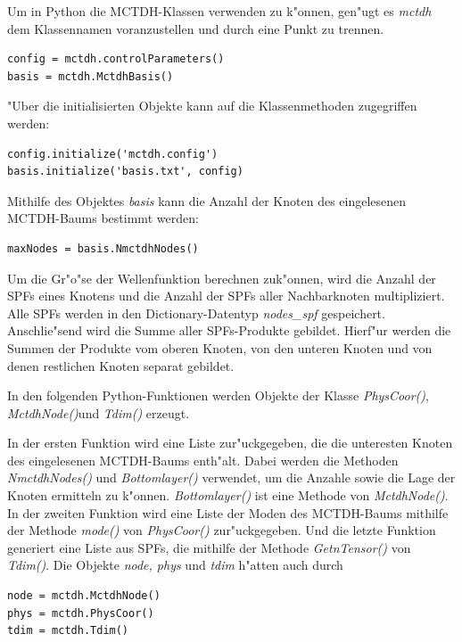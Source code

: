 Um in Python die MCTDH-Klassen verwenden zu k"onnen, gen"ugt es \textit{mctdh} dem Klassennamen voranzustellen und durch eine Punkt zu trennen.

\begin{verbatim}
config = mctdh.controlParameters()
basis = mctdh.MctdhBasis()
\end{verbatim}

"Uber die initialisierten Objekte kann auf die Klassenmethoden zugegriffen werden: 
\begin{verbatim}
config.initialize('mctdh.config')
basis.initialize('basis.txt', config)
\end{verbatim}

Mithilfe des Objektes \textit{basis} kann die Anzahl der Knoten des eingelesenen MCTDH-Baums bestimmt werden:
\begin{verbatim}
maxNodes = basis.NmctdhNodes()
\end{verbatim}

Um die Gr"o"se der Wellenfunktion berechnen zuk"onnen, wird die Anzahl der SPFs eines Knotens
und die Anzahl der SPFs aller Nachbarknoten multipliziert.
Alle SPFs werden in den Dictionary-Datentyp \textit{nodes_spf} gespeichert. 
Anschlie"send wird die Summe aller SPFs-Produkte gebildet.
Hierf"ur werden die Summen der Produkte vom oberen Knoten, von den unteren Knoten und von denen
restlichen Knoten separat gebildet. 



In den folgenden Python-Funktionen werden Objekte der Klasse \textit{PhysCoor()}, \textit{MctdhNode()}und \textit{Tdim()} erzeugt. 


In der ersten Funktion wird eine Liste zur"uckgegeben, die die unteresten Knoten des eingelesenen MCTDH-Baums enth"alt.
Dabei werden die Methoden \textit{NmctdhNodes()} und \textit{Bottomlayer()} verwendet, um die Anzahle sowie die Lage der Knoten
ermitteln zu k"onnen. \textit{Bottomlayer()} ist eine Methode von \textit{MctdhNode()}.
In der zweiten Funktion wird eine Liste der Moden des MCTDH-Baums mithilfe der Methode \textit{mode()} von \textit{PhysCoor()} zur"uckgegeben. 
Und die letzte Funktion generiert eine Liste aus SPFs, die mithilfe der Methode \textit{GetnTensor()} von \textit{Tdim()}.
Die Objekte \textit{node, phys} und \textit{tdim} h"atten auch durch 

\begin{verbatim}
node = mctdh.MctdhNode()
phys = mctdh.PhysCoor()
tdim = mctdh.Tdim()
\end{verbatim}

